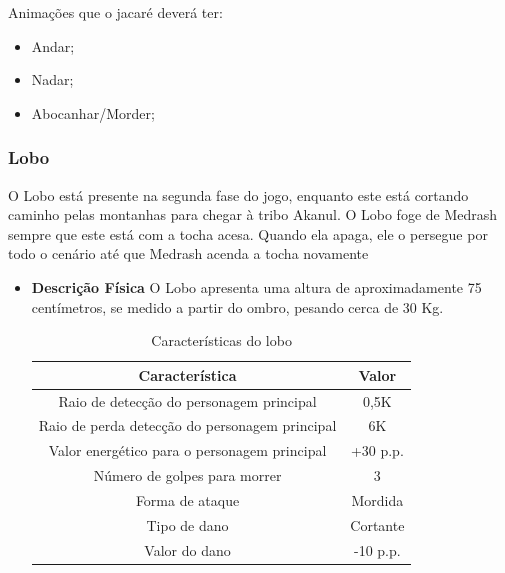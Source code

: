 \begin{itemize}
Animações que o jacaré deverá ter:
\begin{itemize}
\item Andar;
\item Nadar;
\item Abocanhar/Morder;
\end{itemize}
\end{itemize}
\subsubsection{Lobo}
O Lobo está presente na segunda fase do jogo, enquanto este está cortando caminho pelas montanhas para chegar à tribo Akanul. O Lobo foge de Medrash sempre que este está com a tocha acesa. Quando ela apaga, ele o persegue por todo o cenário até que Medrash acenda a tocha novamente
\begin{itemize}
\item {\bf Descrição Física}
O Lobo apresenta uma altura de aproximadamente 75 centímetros, se medido a partir do ombro, pesando cerca de 30 Kg.
\begin{table}[ht]
\begin{center}
\begin{tabular}{|c|c|}
\hline 
\textbf{Característica} & \textbf{Valor} \\ 
\hline 
Raio de detecção do personagem principal & 0,5K \\ 
\hline 
Raio de perda detecção do personagem principal & 6K \\ 
\hline 
Valor energético para o personagem principal & +30 p.p. \\ 
\hline 
Número de golpes para morrer & 3 \\ 
\hline 
Forma de ataque & Mordida \\ 
\hline 
Tipo de dano & Cortante \\ 
\hline 
Valor do dano & -10 p.p. \\ 
\hline 
\end{tabular} 
\end{center}
\caption{Características do lobo}
\label{table:lobo}
\end{table}
\end{itemize}
